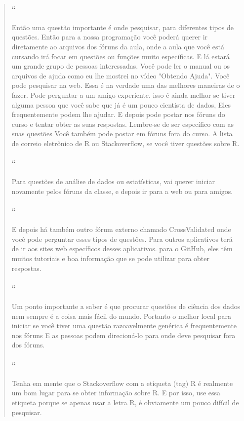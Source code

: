 \begin{quotation}
\begin{small}
\paragraph{``}
Então uma questão importante é onde pesquisar, para diferentes tipos de questões. Então para a nossa programação você poderá querer ir diretamente ao arquivos dos fóruns da aula, onde a aula que você está cursando irá focar em questões ou funções muito específicas. E lá estará um grande grupo de pessoas interessadas. Você pode ler o manual ou os arquivos de ajuda como eu lhe mostrei no vídeo "Obtendo Ajuda". Você pode pesquisar na web. Essa é na verdade uma das melhores maneiras de o fazer. Pode perguntar a um amigo experiente. isso é ainda melhor se tiver alguma pessoa que você sabe que já é um pouco cientista de dados, Eles frequentemente podem lhe ajudar. E depois pode postar nos fóruns do curso e tentar obter as suas respostas. Lembre-se de ser específico com as suas questões Você também pode postar em fóruns fora do curso. A lista de correio eletrônico de R ou Stackoverflow, se você tiver questões sobre R. 

\paragraph{``}
Para questões de análise de dados ou estatísticas, vai querer iniciar novamente pelos fóruns da classe, e depois ir para a web ou para amigos. 

\paragraph{``}
E depois há também outro fórum externo chamado CrossValidated onde você pode perguntar esses tipos de questões. Para outros aplicativos terá de ir aos sites web específicos desses aplicativos. para o GitHub, eles têm muitos tutoriais e boa informação que se pode utilizar para obter respostas. 

\paragraph{``}
Um ponto importante a saber é que procurar questões de ciência dos dados nem sempre é a coisa mais fácil do mundo. Portanto o melhor local para iniciar se você tiver uma questão razoavelmente genérica é frequentemente nos fóruns E as pessoas podem direcioná-lo para onde deve pesquisar fora dos fóruns. 

\paragraph{``}
Tenha em mente que o Stackoverflow com a etiqueta (tag) R é realmente um bom lugar para se obter informação sobre R. E por isso, use essa etiqueta porque se apenas usar a letra R,  é obviamente um pouco difícil de pesquisar. 


\end{small}
\end{quotation}
